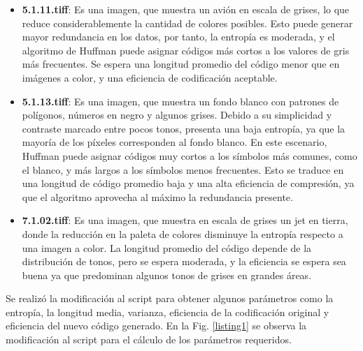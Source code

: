 \documentclass[conference,onecolumn,12pt]{IEEEtran}
\numberwithin{equation}{subsection}
\begin{document}
\begin{itemize}
    \item \textbf{5.1.11.tiff}: Es una imagen, que muestra un avión en escala de grises, lo que reduce considerablemente la cantidad de colores posibles. Esto puede generar mayor redundancia en los datos, por tanto, la entropía es moderada, y el algoritmo de Huffman puede asignar códigos más cortos a los valores de gris más frecuentes. Se espera una longitud promedio del código menor que en imágenes a color, y una eficiencia de codificación aceptable.
    \item \textbf{5.1.13.tiff}: Es una imagen, que muestra un fondo blanco con patrones de polígonos, números en negro y algunos grises. Debido a su simplicidad y contraste marcado entre pocos tonos, presenta una baja entropía, ya que la mayoría de los píxeles corresponden al fondo blanco. En este escenario, Huffman puede asignar códigos muy cortos a los símbolos más comunes, como el blanco, y más largos a los símbolos menos frecuentes. Esto se traduce en una longitud de código promedio baja y una alta eficiencia de compresión, ya que el algoritmo aprovecha al máximo la redundancia presente.
    \item \textbf{7.1.02.tiff}: Es una imagen, que muestra en escala de grises un jet en tierra, donde la reducción en la paleta de colores disminuye la entropía respecto a una imagen a color. La longitud promedio del código depende de la distribución de tonos, pero se espera moderada, y la eficiencia se espera sea buena ya que predominan algunos tonos de grises en grandes áreas.
\end{itemize}

Se realizó la modificación al script para obtener algunos parámetros como la entropía, la longitud media, varianza, eficiencia de la codificación original y eficiencia del nuevo código generado. En la Fig. \ref{listing1} se observa la modificación al script para el cálculo de los parámetros requeridos.

\end{document}
